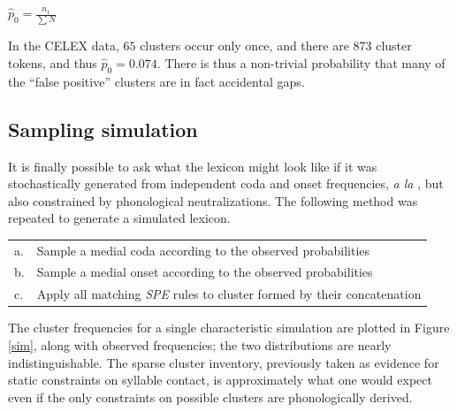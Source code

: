\begin{unlabeledexample}
$\displaystyle \hat{p}_0 = \frac{n_1}{\displaystyle\sum N}$
\end{unlabeledexample}

\noindent In the CELEX data, $65$ clusters occur only once, and there are 873 cluster tokens, and thus $\hat{p}_0 = 0.074$. There is thus a non-trivial probability that many of the ``false positive'' clusters are in fact accidental gaps.

\subsection{Sampling simulation}

It is finally possible to ask what the lexicon might look like if it was stochastically generated from independent coda and onset frequencies, \emph{a la} \citeauthor{Pierrehumbert1994}, but also constrained by phonological neutralizations. The following method was repeated to generate a simulated lexicon.

\begin{example}
\begin{tabular}{l l}
a. & Sample a medial coda according to the observed probabilities  \\
b. & Sample a medial onset according to the observed probabilities \\
c. & Apply all matching \emph{SPE} rules to cluster formed by their concatenation \\
\end{tabular}
\end{example}

The cluster frequencies for a single characteristic simulation are plotted in Figure \ref{sim}, along with observed frequencies; the two distributions are nearly indistinguishable. The sparse cluster inventory, previously taken as evidence for static constraints on syllable contact, is approximately what one would expect even if the only constraints on possible clusters are phonologically derived.

